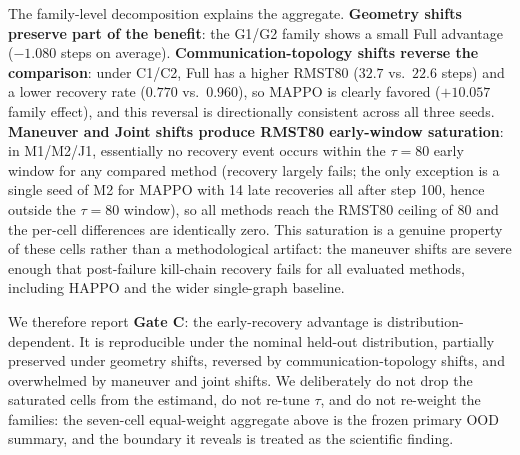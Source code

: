 The family-level decomposition explains the aggregate. \textbf{Geometry shifts preserve part of the benefit}: the G1/G2 family shows a small Full advantage ($-1.080$ steps on average). \textbf{Communication-topology shifts reverse the comparison}: under C1/C2, Full has a higher RMST80 ($32.7$ vs.\ $22.6$ steps) and a lower recovery rate ($0.770$ vs.\ $0.960$), so MAPPO is clearly favored ($+10.057$ family effect), and this reversal is directionally consistent across all three seeds. \textbf{Maneuver and Joint shifts produce RMST80 early-window saturation}: in M1/M2/J1, essentially no recovery event occurs within the $\tau=80$ early window for any compared method (recovery largely fails; the only exception is a single seed of M2 for MAPPO with 14 late recoveries all after step 100, hence outside the $\tau=80$ window), so all methods reach the RMST80 ceiling of $80$ and the per-cell differences are identically zero. This saturation is a genuine property of these cells rather than a methodological artifact: the maneuver shifts are severe enough that post-failure kill-chain recovery fails for all evaluated methods, including HAPPO and the wider single-graph baseline.

We therefore report \textbf{Gate C}: the early-recovery advantage is distribution-dependent. It is reproducible under the nominal held-out distribution, partially preserved under geometry shifts, reversed by communication-topology shifts, and overwhelmed by maneuver and joint shifts. We deliberately do not drop the saturated cells from the estimand, do not re-tune $\tau$, and do not re-weight the families: the seven-cell equal-weight aggregate above is the frozen primary OOD summary, and the boundary it reveals is treated as the scientific finding.



